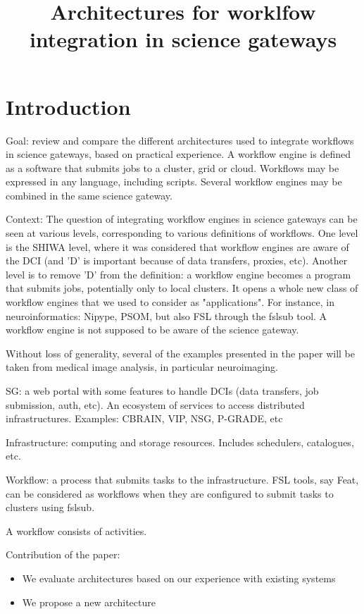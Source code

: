 \documentclass[11pt]{article}
\title{Architectures for worklfow integration in science gateways}
\begin{document}
\maketitle

\section{Introduction}

Goal: review and compare the different architectures used to integrate
workflows in science gateways, based on practical experience.  A
workflow engine is defined as a software that submits jobs to a
cluster, grid or cloud. Workflows may be expressed in any language,
including scripts. Several workflow engines may be combined in the
same science gateway.

Context: The question of integrating workflow engines in science gateways can
be seen at various levels, corresponding to various definitions of
workflows. One level is the SHIWA level, where it was considered that
workflow engines are aware of the DCI (and 'D' is important because of
data transfers, proxies, etc). Another level is to remove 'D' from the
definition: a workflow engine becomes a program that submits jobs,
potentially only to local clusters. It opens a whole new class of
workflow engines that we used to consider as "applications". For
instance, in neuroinformatics: Nipype, PSOM, but also FSL through the
fslsub tool. A workflow engine is not supposed to be aware of the science gateway.

Without loss of generality, several of the examples presented in the
paper will be taken from medical image analysis, in particular
neuroimaging.

SG: a web portal with some features to handle DCIs (data transfers,
job submission, auth, etc). An ecosystem of services to access
distributed infrastructures. Examples: CBRAIN, VIP, NSG, P-GRADE, etc

Infrastructure: computing and storage resources. Includes schedulers, catalogues, etc.

Workflow: a process that submits tasks to the infrastructure. FSL
tools, say Feat, can be considered as workflows when they are
configured to submit tasks to clusters using fslsub.

A workflow consists of activities.

Contribution of the paper:
\begin{itemize}
\item We evaluate architectures based on our experience with existing systems
\item We propose a new architecture
\end{itemize}
\end{document}
